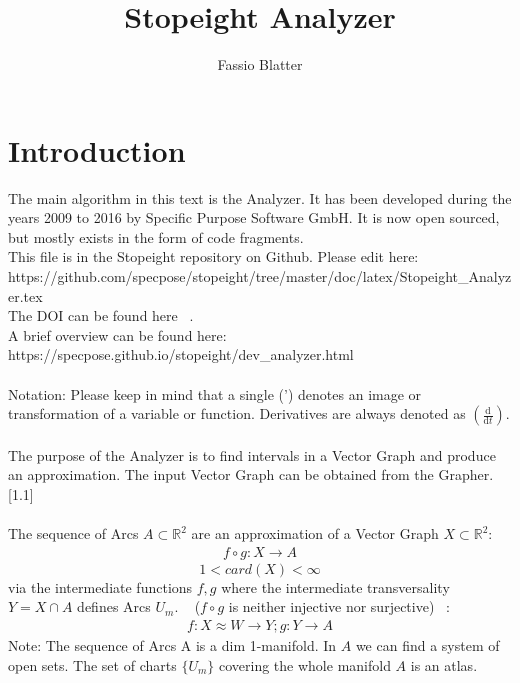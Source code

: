 \documentclass{report}
\begin{document}
\title{Stopeight Analyzer}
\author{Fassio Blatter}
\maketitle

\chapter{Introduction}
The main algorithm in this text is the Analyzer. It has been developed during the years 2009 to 2016 by Specific Purpose Software GmbH. It is now open sourced, but mostly exists in the form of code fragments.\\
This file is in the Stopeight repository on Github. Please edit here:\\
https://github.com/specpose/stopeight/tree/master/doc/latex/Stopeight\_Analyzer.tex\\
The DOI can be found here ~\cite{Analyzer}.\\
A brief overview can be found here:\\
https://specpose.github.io/stopeight/dev\_analyzer.html\\\\
Notation: Please keep in mind that a single (') denotes an image or transformation of a variable or function. Derivatives are always denoted as $(\frac{\mathrm{d}}{\mathrm{d}t})$.\\\\
The purpose of the Analyzer is to find intervals in a Vector Graph and produce an approximation. The input Vector Graph can be obtained from the Grapher. \cite{Grapher}[1.1]\\\\
The sequence of Arcs $A \subset \mathbb{R}^2$ are an approximation of a Vector Graph $X \subset \mathbb{R}^2$:
\begin{align}
f \circ g: X \rightarrow A
\end{align}
\begin{equation*}
1 < card(X) < \infty
\end{equation*}
via the intermediate functions $f,g$ where the intermediate transversality $Y = X \cap A$ defines Arcs $U_{m}$. ~\cite[9.9]{Loring} ($f \circ g$ is neither injective nor surjective) ~\cite[2.1]{LauresSzymik}:
\begin{align}
f: X \approx W \rightarrow Y; g: Y \rightarrow A
\end{align}
Note: The sequence of Arcs A is a dim 1-manifold. In $A$ we can find a system of open sets. The set of charts $\{U_{m}\}$ covering the whole manifold $A$ is an atlas. ~\cite[3.1.1.]{Fomenko} ~\cite[4.5]{Wall}
\end{document}
